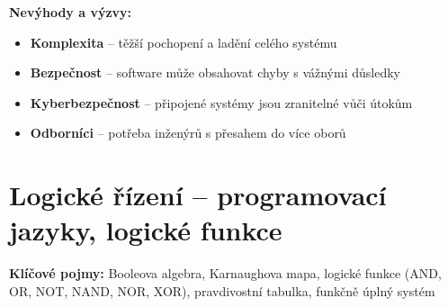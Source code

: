 \documentclass[a4paper,10pt]{article}
\begin{document}
\begin{vysvetlenibox}
\textbf{Nevýhody a výzvy:}
\begin{itemize}[noitemsep, leftmargin=1.4em, topsep=4pt]
    \item \textbf{Komplexita} -- těžší pochopení a ladění celého systému
    \item \textbf{Bezpečnost} -- software může obsahovat chyby s vážnými důsledky
    \item \textbf{Kyberbezpečnost} -- připojené systémy jsou zranitelné vůči útokům
    \item \textbf{Odborníci} -- potřeba inženýrů s přesahem do více oborů
\end{itemize}
\end{vysvetlenibox}



\newpage

\section{Logické řízení -- programovací jazyky, logické funkce}

\begin{pojmybox}
\textbf{Klíčové pojmy:}
Booleova algebra, Karnaughova mapa, logické funkce (AND, OR, NOT, NAND, NOR, XOR),
pravdivostní tabulka, funkčně úplný systém
\end{pojmybox}
\end{document}
